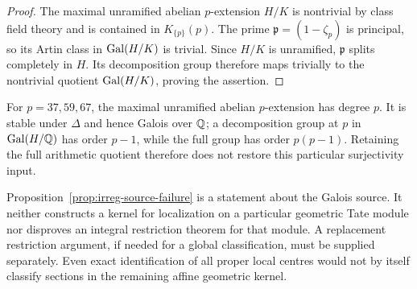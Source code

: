 \begin{proof}
The maximal unramified abelian \(p\)-extension \(H/K\) is nontrivial
by class field theory and is contained in \(K_{\{p\}}(p)\).
The prime \(\mathfrak p=(1-\zeta_p)\) is principal, so its Artin
class in \(\operatorname{Gal}(H/K)\) is trivial. Since \(H/K\) is unramified,
\(\mathfrak p\) splits completely in \(H\). Its decomposition
group therefore maps trivially to the nontrivial quotient
\(\operatorname{Gal}(H/K)\), proving the assertion.
\end{proof}

For \(p=37,59,67\), the maximal unramified abelian \(p\)-extension
has degree \(p\). It is stable under \(\Delta\) and hence Galois
over \(\mathbb Q\); a decomposition group at \(p\) in \(\operatorname{Gal}(H/\mathbb Q)\) has
order \(p-1\), while the full group has order \(p(p-1)\).
Retaining the full arithmetic quotient therefore does not restore
this particular surjectivity input.

Proposition~\ref{prop:irreg-source-failure} is a statement about the
Galois source. It neither constructs a kernel for localization on
a particular geometric Tate module nor disproves an integral
restriction theorem for that module. A replacement restriction
argument, if needed for a global classification, must be supplied
separately. Even exact identification of all proper local centres
would not by itself classify sections in the remaining affine
geometric kernel.

